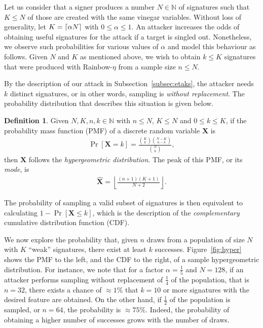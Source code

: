 \documentclass[english]{ufsc-thesis-rn46-2019/ufsc-thesis-rn46-2019}
\DeclarePairedDelimiter{\ceil}{\lceil}{\rceil}
\theoremstyle{definition}
\newtheorem{definition}[theorem]{Definition}
\begin{document}
Let us consider that a signer produces a number $N \in \mathbb{N}$ of
signatures such that $K \leq N$ of those are created with the same vinegar
variables. Without loss of generality, let $K = \ceil{\alpha N}$ with $0 \leq
\alpha \leq 1$. An attacker increases the odds of obtaining useful signatures
for the attack if a target is singled out. Nonetheless, we observe such
probabilities for various values of $\alpha$ and model this behaviour as
follows. Given $N$ and $K$ as mentioned above, we wish to obtain $k \leq K$
signatures that were produced with Rainbow-$\eta$ from a sample size
$n \leq N$.

By the description of our attack in Subsection~\ref{subsec:etaks}, the attacker
needs $k$ distinct signatures, or in other words, sampling is \emph{without
replacement}. The probability distribution that describes this situation is
given below.
\begin{definition}
  Given $N, K, n, k \in \mathbb{N}$ with $n \leq N$, $K \leq N$ and
  $0 \leq k \leq K$, if the probability mass function (PMF) of a discrete
  random variable $\mathbf{X}$ is
  \begin{align*}
    \Pr[\mathbf{X} = k]
      = \frac{\binom{K}{k}\binom{N - K}{n - k}}{\binom{N}{n}},
  \end{align*}
  then $\mathbf{X}$ follows the \emph{hypergeometric distribution}. The peak of
  this PMF, or its \emph{mode}, is
  \begin{align*}
    \widehat{\mathbf{X}}
      = \left\lfloor \frac{(n + 1)(K + 1)}{N + 2} \right\rfloor.
  \end{align*}
\end{definition}
The probability of sampling a valid subset of signatures is then equivalent to
calculating $1 - \Pr[\mathbf{X} \leq k]$, which is the description of the
\emph{complementary} cumulative distribution function (CDF).

We now explore the probability that, given $n$ draws from a population of size
$N$ with $K$ ``weak'' signatures, there exist at least $k$
successes. Figure~\ref{fig:hyper} shows the PMF to the left, and the CDF to the
right, of a sample hypergeometric distribution. For instance, we note that for
a factor $\alpha = \frac{1}{5}$ and $N = 128$, if an attacker performs sampling
without replacement of $\frac{1}{4}$ of the population, that is $n = 32$, there
exists a chance of $\approx 1\%$ that $k = 10$ or more signatures with the
desired feature are obtained. On the other hand, if $\frac{1}{2}$ of the
population is sampled, or $n = 64$, the probability is $\approx 75\%$. Indeed,
the probability of obtaining a higher number of successes grows with the number
of draws.
\end{document}
